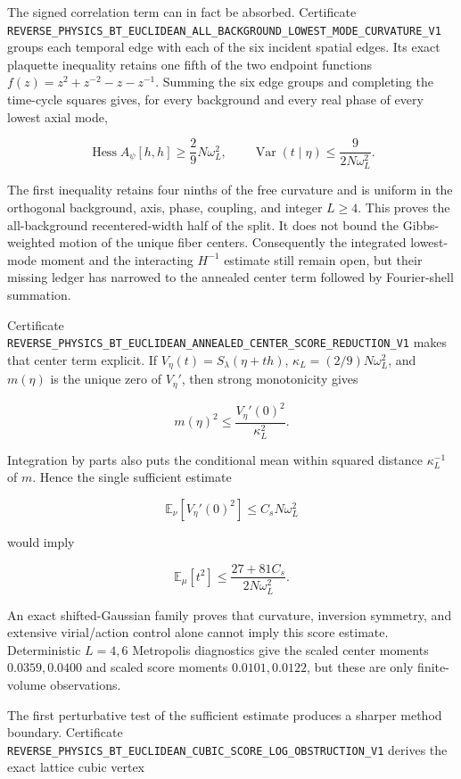 \documentclass[11pt]{article}
\theoremstyle{definition}
\theoremstyle{remark}
\newcommand{\cert}[1]{\nolinkurl{#1}}
\begin{document}
The signed correlation term can in fact be absorbed.  Certificate
\cert{REVERSE_PHYSICS_BT_EUCLIDEAN_ALL_BACKGROUND_LOWEST_MODE_CURVATURE_V1}
groups each temporal edge with each of the six incident spatial edges.  Its
exact plaquette inequality retains one fifth of the two endpoint functions
$f(z)=z^2+z^{-2}-z-z^{-1}$.  Summing the six edge groups and completing the
time-cycle squares gives, for every background and every real phase of every
lowest axial mode,

\[
 \operatorname{Hess}A_\psi[h,h]\geq\frac{2}{9}N\omega_L^2,
 \qquad
 \operatorname{Var}(t\mid\eta)\leq\frac{9}{2N\omega_L^2}.
\]

The first inequality retains four ninths of the free curvature and is uniform
in the orthogonal background, axis, phase, coupling, and integer $L\geq4$.
This proves the all-background recentered-width half of the split.  It does
not bound the Gibbs-weighted motion of the unique fiber centers.  Consequently
the integrated lowest-mode moment and the interacting $H^{-1}$ estimate still
remain open, but their missing ledger has narrowed to the annealed center term
followed by Fourier-shell summation.

Certificate
\cert{REVERSE_PHYSICS_BT_EUCLIDEAN_ANNEALED_CENTER_SCORE_REDUCTION_V1}
makes that center term explicit.  If
$V_\eta(t)=S_\lambda(\eta+th)$,
$\kappa_L=(2/9)N\omega_L^2$, and $m(\eta)$ is the unique zero of
$V_\eta'$, then strong monotonicity gives

\[
 m(\eta)^2\leq\frac{V_\eta'(0)^2}{\kappa_L^2}.
\]

Integration by parts also puts the conditional mean within squared distance
$\kappa_L^{-1}$ of $m$.  Hence the single sufficient estimate

\[
 \mathbb E_\nu[V_\eta'(0)^2]\leq C_sN\omega_L^2
\]

would imply

\[
 \mathbb E_\mu[t^2]\leq
 \frac{27+81C_s}{2N\omega_L^2}.
\]

An exact shifted-Gaussian family proves that curvature, inversion symmetry,
and extensive virial/action control alone cannot imply this score estimate.
Deterministic $L=4,6$ Metropolis diagnostics give the scaled center moments
$0.0359,0.0400$ and scaled score moments $0.0101,0.0122$, but these are only
finite-volume observations.

The first perturbative test of the sufficient estimate produces a sharper
method boundary.  Certificate
\cert{REVERSE_PHYSICS_BT_EUCLIDEAN_CUBIC_SCORE_LOG_OBSTRUCTION_V1}
derives the exact lattice cubic vertex
\end{document}
